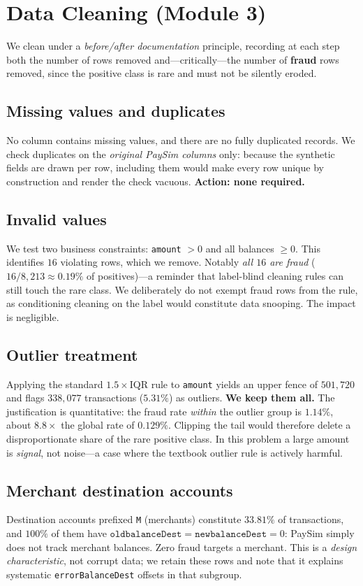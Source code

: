 \documentclass{article}
\begin{document}
\section{Data Cleaning (Module 3)}
\label{sec:clean}

We clean under a \emph{before/after documentation} principle, recording
at each step both the number of rows removed and---critically---the
number of \textbf{fraud} rows removed, since the positive class is rare
and must not be silently eroded.

\subsection{Missing values and duplicates}
No column contains missing values, and there are no fully duplicated
records. We check duplicates on the \emph{original PaySim columns}
only: because the synthetic fields are drawn per row, including them
would make every row unique by construction and render the check
vacuous. \textbf{Action: none required.}

\subsection{Invalid values}
We test two business constraints: \texttt{amount} $> 0$ and all
balances $\ge 0$. This identifies $16$ violating rows, which we remove.
Notably \emph{all $16$ are fraud} ($16/8{,}213 \approx 0.19\%$ of
positives)---a reminder that label-blind cleaning rules can still touch
the rare class. We deliberately do not exempt fraud rows from the rule,
as conditioning cleaning on the label would constitute data snooping.
The impact is negligible.

\subsection{Outlier treatment}
Applying the standard $1.5\times$IQR rule to \texttt{amount} yields an
upper fence of $501{,}720$ and flags $338{,}077$ transactions
($5.31\%$) as outliers. \textbf{We keep them all.} The justification is
quantitative: the fraud rate \emph{within} the outlier group is
$1.14\%$, about $8.8\times$ the global rate of $0.129\%$. Clipping the
tail would therefore delete a disproportionate share of the rare
positive class. In this problem a large amount is \emph{signal}, not
noise---a case where the textbook outlier rule is actively harmful.

\subsection{Merchant destination accounts}
Destination accounts prefixed \texttt{M} (merchants) constitute
$33.81\%$ of transactions, and $100\%$ of them have
$\texttt{oldbalanceDest} = \texttt{newbalanceDest} = 0$: PaySim simply
does not track merchant balances. Zero fraud targets a merchant. This
is a \emph{design characteristic}, not corrupt data; we retain these
rows and note that it explains systematic \texttt{errorBalanceDest}
offsets in that subgroup.
\end{document}
